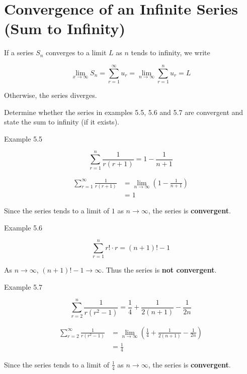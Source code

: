 \documentclass[11pt,a4paper]{book}
\begin{document}
\section{Convergence of an Infinite Series (Sum to Infinity)}

\begin{tcolorbox}[colback=blue!5, colframe=black,boxrule=.4pt, sharpish corners]

If a series $S_{n}$ converges to a limit $L$ as $n$ tends to infinity,
we write

\[
\lim_{x\to\infty}S_{n}=\sum_{r=1}^{\infty}u_{r}=\lim_{n\to\infty}\sum_{r=1}^{n}u_{r}=L
\]

Otherwise, the series diverges.
\end{tcolorbox}

\begin{example}

Determine whether the series in examples \textsf{5.5}, \textsf{5.6} and \textsf{5.7} are convergent and state the sum to infinity (if it exists).

\Solution

\textsf{Example 5.5}

\[
\sum_{r=1}^{n}\frac{1}{r\left(r+1\right)}=1-\frac{1}{n+1}
\]

\begin{align*}
\sum_{r=1}^{\infty}\frac{1}{r\left(r+1\right)} & =\lim_{n\to\infty}\left(1-\frac{1}{n+1}\right)\\
 & =1
\end{align*}

Since the series tends to a limit of $1$ as $n\to\infty$, the series
is \textbf{convergent}.

\bigskip

\textsf{Example 5.6}

\[
\sum_{r=1}^{n}r!\cdot r=\left(n+1\right)!-1
\]

As $n\to\infty$, $\left(n+1\right)!-1\to\infty$. Thus the series
is \textbf{not convergent}.

\bigskip

\textsf{Example 5.7}

\[
\sum_{r=2}^{n}\frac{1}{r\left(r^{2}-1\right)}=\frac{1}{4}+\frac{1}{2\left(n+1\right)}-\frac{1}{2n}
\]

\begin{align*}
{\displaystyle \sum_{r=2}^{\infty}\frac{1}{r\left(r^{2}-1\right)}} & =\lim_{n\to\infty}\left(\frac{1}{4}+\frac{1}{2\left(n+1\right)}-\frac{1}{2n}\right)\\
 & =\frac{1}{4}
\end{align*}

Since the series tends to a limit of ${\displaystyle \frac{1}{4}}$
as $n\to\infty$, the series is \textbf{convergent}.

\end{example}
\end{document}
